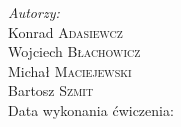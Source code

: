 \begin{titlepage}
\flushright
\Large \emph{Autorzy:}\\
Konrad \textsc{Adasiewcz}\\[0.1cm] %
Wojciech \textsc{Błachowicz}\\[0.1cm] %
Michał \textsc{Maciejewski}\\[0.1cm] %
Bartosz \textsc{Szmit}\\[3cm] %

Data wykonania ćwiczenia: \\
{\large {}}\\[1cm]


\vfill %

\end{titlepage}